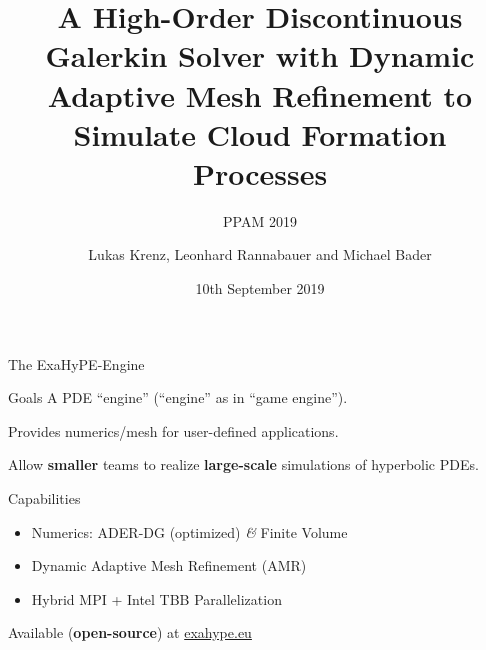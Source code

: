 \documentclass[aspectratio=169]{beamer}
\title[High-Order DG with Dynamic AMR to Simulate Clouds]{A High-Order Discontinuous Galerkin Solver with Dynamic Adaptive Mesh Refinement to Simulate Cloud Formation Processes}
\subtitle[PPAM]{PPAM 2019}
\author[Krenz, Rannabauer, Bader]{Lukas Krenz, Leonhard Rannabauer and Michael Bader}
\date{10th September 2019}
\institute{Technical University of Munich}
\begin{document}
\maketitle
\begin{frame}{The ExaHyPE-Engine}
  \begin{block}{Goals}
   A PDE \enquote{engine} (\enquote{engine} as in \enquote{game engine}).

   Provides numerics/mesh for user-defined applications.

   Allow \textbf{smaller} teams to realize \textbf{large-scale} simulations of hyperbolic PDEs.
  \end{block}
  \begin{block}{Capabilities}
    \begin{itemize}
    \item Numerics: ADER-DG (optimized) \textit{\&} Finite Volume
    \item Dynamic Adaptive Mesh Refinement (AMR)
    \item Hybrid MPI + Intel TBB Parallelization
    \end{itemize}
  \end{block}

  Available (\textbf{open-source}) at \url{exahype.eu}
\end{frame}
\end{document}
